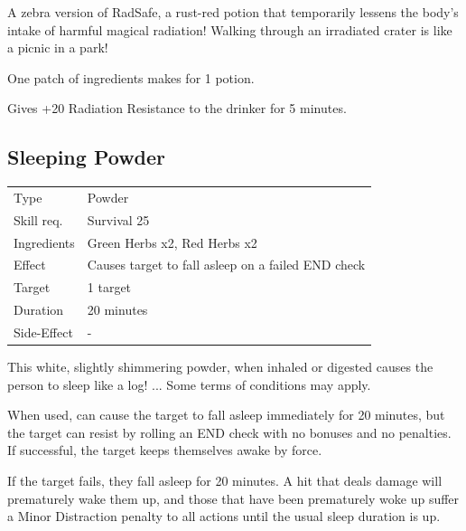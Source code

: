 \documentclass[11pt,a4paper,twocolumn]{book}
\begin{document}
\medskip

A zebra version of RadSafe, a rust-red potion that temporarily lessens the body's intake of harmful magical radiation! Walking through an irradiated crater is like a picnic in a park!

One patch of ingredients makes for 1 potion.

Gives +20 Radiation Resistance to the drinker for 5 minutes.

\vfill

\subsection*{Sleeping Powder}
{
	\begin{tabu} to 75mm{| X[l,4] | X[l,8] |}
		\hline
		Type 			& Powder 													\\
        Skill req.	    & Survival 25 												\\
        Ingredients     & Green Herbs x2, Red Herbs x2								\\
        Effect     		& Causes target to fall asleep on a failed END check 								\\
        Target      	& 1 target													\\
        Duration  		& 20 minutes	 												\\
        Side-Effect     & -															\\ \hline
	\end{tabu}
		
}

\medskip

This white, slightly shimmering powder, when inhaled or digested causes the person to sleep like a log! ... Some terms of conditions may apply.

When used, can cause the target to fall asleep immediately for 20 minutes, but the target can resist by rolling an END check with no bonuses and no penalties. If successful, the target keeps themselves awake by force.

If the target fails, they fall asleep for 20 minutes. A hit that deals damage will prematurely wake them up, and those that have been prematurely woke up suffer a Minor Distraction penalty to all actions until the usual sleep duration is up.
\end{document}

